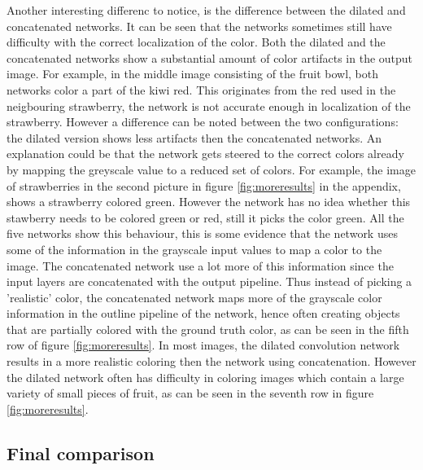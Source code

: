 Another interesting differenc to notice, is the difference between the dilated and concatenated networks. It can be seen that the networks sometimes still have difficulty with the correct localization of the color. Both the dilated and the concatenated networks show a substantial amount of color artifacts in the output image. For example, in the middle image consisting of the fruit bowl, both networks color a part of the kiwi red. This originates from the red used in the neigbouring strawberry, the network is not accurate enough in localization of the strawberry. However a difference can be noted between the two configurations: the dilated version shows less artifacts then the concatenated networks. An explanation could be that the network gets steered to the correct colors already by mapping the greyscale value to a reduced set of colors. For example, the image of strawberries in the second picture in figure \ref{fig:moreresults} in the appendix, shows a strawberry colored green. However the network has no idea whether this stawberry needs to be colored green or red, still it picks the color green. All the five networks show this behaviour, this is some evidence that the network uses some of the information in the grayscale input values to map a color to the image. The concatenated network use a lot more of this information since the input layers are concatenated with the output pipeline. Thus instead of picking a 'realistic' color, the concatenated network maps more of the grayscale color information in the outline pipeline of the network, hence often creating objects that are partially colored with the ground truth color, as can be seen in the fifth row of figure \ref{fig:moreresults}. In most images, the dilated convolution network results in a more realistic coloring then the network using concatenation. However the dilated network often has difficulty in coloring images which contain a large variety of small pieces of fruit, as can be seen in the seventh row in figure \ref{fig:moreresults}.

\subsection{Final comparison}








